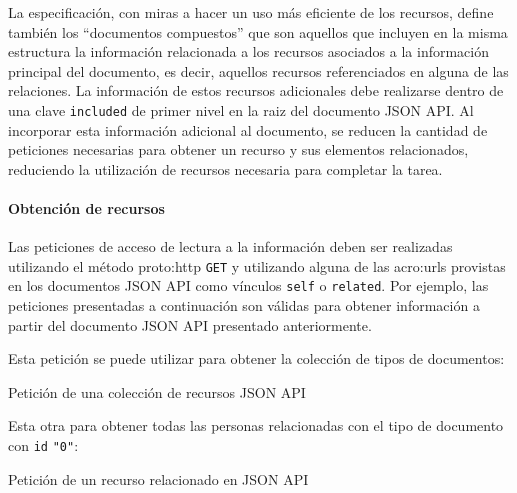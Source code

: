 La especificación, con miras a hacer un uso más eficiente de los recursos, define también los ``documentos compuestos'' que son aquellos que incluyen en la misma estructura la información relacionada a los recursos asociados a la información principal del documento, es decir, aquellos recursos referenciados en alguna de las relaciones. La información de estos recursos adicionales debe realizarse dentro de una clave \texttt{included} de primer nivel en la raiz del documento JSON API. Al incorporar esta información adicional al documento, se reducen la cantidad de peticiones necesarias para obtener un recurso y sus elementos relacionados, reduciendo la utilización de recursos necesaria para completar la tarea.

\begingroup
\endgroup

\paragraph{Obtención de recursos}

Las peticiones de acceso de lectura a la información deben ser realizadas utilizando el método \gls{proto:http} \texttt{GET} y utilizando alguna de las \glspl{acro:url} provistas en los documentos JSON API como vínculos \texttt{self} o \texttt{related}. Por ejemplo, las peticiones presentadas a continuación son válidas para obtener información a partir del documento JSON API presentado anteriormente.

Esta petición se puede utilizar para obtener la colección de tipos de documentos:

\begin{listing}[H]
  \caption{Petición de una colección de recursos JSON API}
  \label{soa:tecnologias:json-api:obtener-colecccion}
\end{listing}

Esta otra para obtener todas las personas relacionadas con el tipo de documento con \texttt{id} \texttt{"0"}:

\begin{listing}[H]
  \caption{Petición de un recurso relacionado en JSON API}
  \label{soa:tecnologias:json-api:obtener-recurso-relacionado}
\end{listing}

